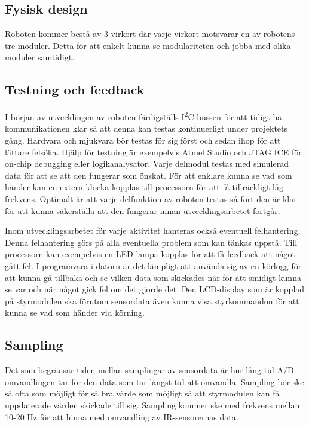 \documentclass[11pt]{article}
\begin{document}
\begin{flushleft}
\subsection{Fysisk design}
Roboten kommer bestå av 3 virkort där varje virkort motsvarar en av robotens tre moduler. Detta för att enkelt kunna se modulariteten och jobba med olika moduler samtidigt.

\subsection{Testning och feedback}
I början av utvecklingen av roboten färdigställs I\textsuperscript{2}C-bussen för att tidigt ha kommunikationen klar så att denna kan testas kontinuerligt under projektets gång. Hårdvara och mjukvara bör testas för sig först och sedan ihop för att lättare felsöka. Hjälp för testning är exempelvis Atmel Studio och JTAG ICE för on-chip debugging eller logikanalysator. Varje delmodul testas med simulerad data för att se att den fungerar som önskat. För att enklare kunna se vad som händer kan en extern klocka kopplas till processorn för att få tillräckligt låg frekvens. Optimalt är att varje delfunktion av roboten testas så fort den är klar för att kunna säkerställa att den fungerar innan utvecklingsarbetet fortgår.  

Inom utvecklingsarbetet för varje aktivitet hanteras också eventuell felhantering. Denna felhantering görs på alla eventuella problem som kan tänkas uppstå. Till processorn kan exempelvis en LED-lampa kopplas för att få feedback att något gått fel. I programvara i datorn är det lämpligt att använda sig av en körlogg för att kunna gå tillbaka och se vilken data som skickades när för att smidigt kunna se var och när något gick fel om det gjorde det. Den LCD-display som är kopplad på styrmodulen ska förutom sensordata även kunna visa styrkommandon för att kunna se vad som händer vid körning.

\subsection{Sampling}
Det som begränsar tiden mellan samplingar av sensordata är hur lång tid A/D omvandlingen tar för den data som tar längst tid att omvandla. Sampling bör ske så ofta som möjligt för så bra värde som möjligt så att styrmodulen kan få uppdaterade värden skickade till sig. Sampling kommer ske med frekvens mellan 10-20 Hz för att hinna med omvandling av IR-sensorernas data. 


\pagebreak
{}



\end{flushleft}
\end{document}
